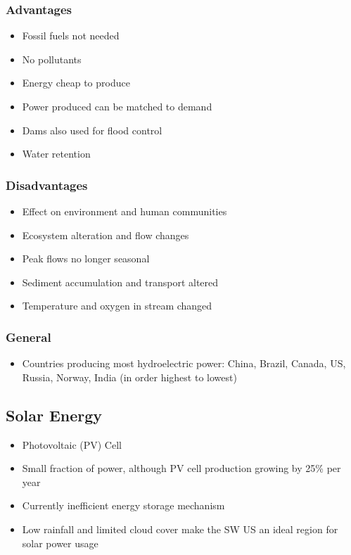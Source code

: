 \documentclass[11pt]{article}
\begin{document}
\subsubsection{Advantages}
\label{sec:org288992c}
\begin{itemize}
\item Fossil fuels not needed
\item No pollutants
\item Energy cheap to produce
\item Power produced can be matched to demand
\item Dams also used for flood control
\item Water retention
\end{itemize}
\subsubsection{Disadvantages}
\label{sec:org612d848}
\begin{itemize}
\item Effect on environment and human communities
\item Ecosystem alteration and flow changes
\item Peak flows no longer seasonal
\item Sediment accumulation and transport altered
\item Temperature and oxygen in stream changed
\end{itemize}
\subsubsection{General}
\label{sec:orgd37090a}
\begin{itemize}
\item Countries producing most hydroelectric power: China, Brazil, Canada, US, Russia, Norway, India (in order highest to lowest)
\end{itemize}
\subsection{Solar Energy}
\label{sec:orgc805904}
\begin{itemize}
\item Photovoltaic (PV) Cell
\item Small fraction of power, although PV cell production growing by 25\% per year
\item Currently inefficient energy storage mechanism
\item Low rainfall and limited cloud cover make the SW US an ideal region for solar power usage
\end{itemize}
\end{document}
